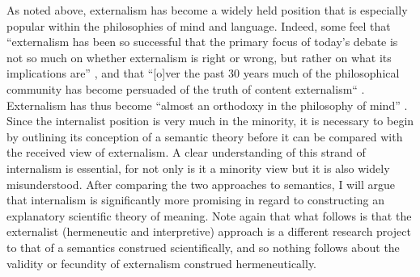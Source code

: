 As noted above, externalism has become a widely held position that is especially popular within the philosophies of mind and language. Indeed, some feel that “externalism has been so successful that the primary focus of today’s debate is not so much on whether externalism is right or wrong, but rather on what its implications are” \citep[158]{Wikforss2008}, and that “[o]ver the past 30 years much of the philosophical community has become persuaded of the truth of content externalism“ \citep[257]{MajorsSawyer2005}. Externalism has thus become “almost an orthodoxy in the philosophy of mind” \citep[187]{Farkas2003}. Since the internalist position is very much in the minority, it is necessary to begin by outlining its conception of a semantic theory before it can be compared with the received view of externalism. A clear understanding of this strand of internalism is essential, for not only is it a minority view but it is also widely misunderstood. After comparing the two approaches to semantics, I will argue that internalism is significantly more promising in regard to constructing an explanatory scientific theory of meaning. Note again that what follows is that the externalist (hermeneutic and interpretive) approach is a different research project to that of a semantics construed scientifically, and so nothing follows about the validity or fecundity of externalism construed hermeneutically.